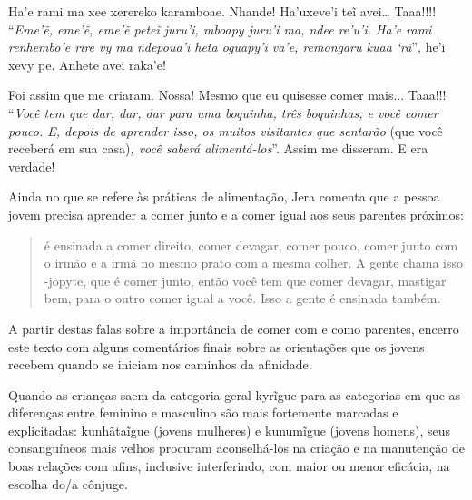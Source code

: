 \begin{paracol}{2}
\switchcolumn
Ha'e rami ma xee xerereko karamboae. Nhande! Ha'uxeve'i teĩ avei\ldots{}
Taaa!!!! ``\emph{Eme'ẽ, eme'ẽ, eme'ẽ peteĩ juru'i, mboapy juru'i ma,
ndee re'u'i. Ha'e rami renhembo'e rire vy ma ndepoua'i heta oguapy'i
va'e, remongaru kuaa `rã}'', he'i xevy pe. Anhete avei raka'e!

\switchcolumn
Foi assim que me criaram. Nossa! Mesmo que eu quisesse comer mais...
Taaa!!! ``\emph{Você tem que dar, dar, dar para uma boquinha, três
boquinhas, e você comer pouco. E, depois de aprender isso, os muitos
visitantes} \emph{que sentarão} (que você receberá em sua casa)\emph{,
você saberá alimentá-los}''. Assim me disseram. E era verdade!
\end{paracol}

\bigskip

Ainda no que se refere às práticas de alimentação, Jera comenta que a
pessoa jovem precisa aprender a comer junto e a comer igual aos seus
parentes próximos:

\begin{quotation}
 é ensinada a comer direito, comer devagar, comer pouco,
comer junto com o irmão e a irmã no mesmo prato com a mesma colher. A
gente chama isso -jopyte, que é comer junto, então você tem que comer
devagar, mastigar bem, para o outro comer igual a você. Isso a gente é
ensinada também.
\end{quotation}

A partir destas falas sobre a importância de comer com e como parentes,
encerro este texto com alguns comentários finais sobre as orientações
que os jovens recebem quando se iniciam nos caminhos da afinidade.

Quando as crianças saem da categoria geral kyrĩgue para as categorias
em que as diferenças entre feminino e masculino são mais fortemente
marcadas e explicitadas: kunhãtaĩgue (jovens mulheres) e
kunumĩgue (jovens homens), seus consanguíneos mais velhos procuram
aconselhá-los na criação e na manutenção de boas relações com afins,
inclusive interferindo, com maior ou menor eficácia, na escolha do/a
cônjuge.

